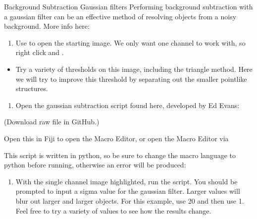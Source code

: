 \documentclass[letterpaper,10pt,english]{jupyterBook}
\begin{document}
\sphinxAtStartPar
Background Subtraction \sphinxhyphen{} Gaussian filters
Performing background subtraction with a gaussian filter can be an effective method of resolving
objects from a noisy background. More info here:
\begin{enumerate}
%
\item {} 
\sphinxAtStartPar
Use  to open the starting image. We only
want one channel to work with, so right click and .

\end{enumerate}
\begin{itemize}
\item {} 
\sphinxAtStartPar
Try a variety of thresholds on this image, including the triangle method. Here we
will try to improve this threshold by separating out the smaller point\sphinxhyphen{}like
structures.

\end{itemize}
\begin{enumerate}
%
\setcounter{enumi}{1}
\item {} 
\sphinxAtStartPar
Open the gaussian subtraction script found here, developed by Ed Evans:

\sphinxAtStartPar
{}

\end{enumerate}

\sphinxAtStartPar
(Download raw file in GitHub.)

\sphinxAtStartPar
Open this in Fiji to open the Macro Editor, or open the Macro Editor via 

\sphinxAtStartPar
This script is written in python, so be sure to change the macro language to
python before running, otherwise an error will be produced:

\sphinxAtStartPar
{}
\begin{enumerate}
%
\setcounter{enumi}{2}
\item {} 
\sphinxAtStartPar
With the single channel image highlighted, run the script. You should be prompted to
input a sigma value for the gaussian filter. Larger values will blur out larger and larger
objects. For this example, use 20 and then use 1. Feel free to try a variety of values to
see how the results change.

\end{enumerate}
\end{document}
